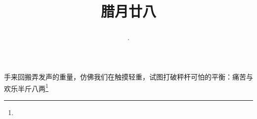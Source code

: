 \title{\date[d=7,m=2,y=2024][year:cn-y,年,month:cn,day:cn,日,·,weekday]·腊月廿八 }
手来回搬弄发声的重量，仿佛我们在触摸轻重，试图打破秤杆可怕的平衡：痛苦与欢乐半斤八两\footnote{ }

